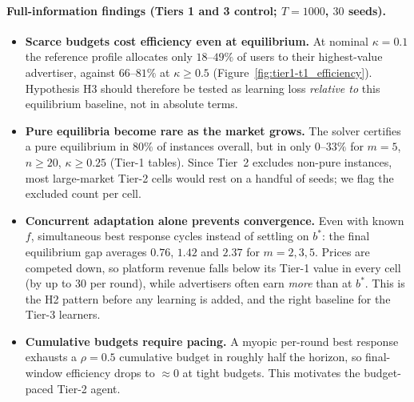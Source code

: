 \documentclass[11pt]{article}
\theoremstyle{remark}
\begin{document}
\paragraph{Full-information findings (Tiers 1 and 3 control; $T=1000$, $30$ seeds).}
\begin{itemize}[leftmargin=*]
  \item \textbf{Scarce budgets cost efficiency even at equilibrium.} At nominal $\kappa=0.1$ the
  reference profile allocates only $18$--$49\%$ of users to their highest-value advertiser, against
  $66$--$81\%$ at $\kappa\ge0.5$ (Figure~\ref{fig:tier1-t1_efficiency}). Hypothesis H3 should therefore be
  tested as learning loss \emph{relative to} this equilibrium baseline, not in absolute terms.
  \item \textbf{Pure equilibria become rare as the market grows.} The solver certifies a pure
  equilibrium in $80\%$ of instances overall, but in only $0$--$33\%$ for $m=5$, $n\ge20$, $\kappa\ge0.25$
(Tier-1 tables).
  Since Tier~2 excludes non-pure instances, most large-market Tier-2 cells would rest on a handful of
  seeds; we flag the excluded count per cell.
  \item \textbf{Concurrent adaptation alone prevents convergence.} Even with known $f$, simultaneous
  best response cycles instead of settling on $b^*$: the final equilibrium gap averages $0.76$, $1.42$ and
  $2.37$ for $m=2,3,5$. Prices are competed down, so platform revenue falls below its Tier-1 value in
  every cell (by up to $30$ per round), while advertisers often earn \emph{more} than at $b^*$. This is
  the H2 pattern before any learning is added, and the right baseline for the Tier-3 learners.
  \item \textbf{Cumulative budgets require pacing.} A myopic per-round best response exhausts a
  $\rho=0.5$ cumulative budget in roughly half the horizon, so final-window efficiency drops to $\approx 0$
  at tight budgets. This motivates the budget-paced Tier-2 agent.
\end{itemize}
\end{document}
